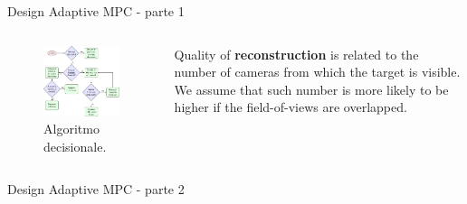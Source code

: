 \documentclass{beamer}
\begin{document}
	\begin{frame}{Design Adaptive MPC - parte 1} %
	\begin{columns}[onlytextwidth,T]
		\begin{column}[c]{0.72\textwidth}
		\begin{figure}[!h]
			\vspace{-2.3em}
			\centering
			\includegraphics[width=
			\textwidth]{./images/flowchart/flowchart.pdf}
			\captionsetup{singlelinecheck = false, format= hang, justification=raggedright,}
			\caption{Algoritmo decisionale.}
			\label{fig:flowchart}
		\end{figure}
		\end{column}	
		\vspace{-1.1em}		
		\begin{column}[c]{0.27\textwidth}
			Quality of \textbf{reconstruction} is related to the number
			of cameras from which the target is visible.
			We assume that such number is more likely to be
			higher if the field-of-views are overlapped.
		\end{column}
	\end{columns}
	\end{frame}
	
	\begin{frame}{Design Adaptive MPC - parte 2} %
		
	\end{frame}
	
\end{document}
